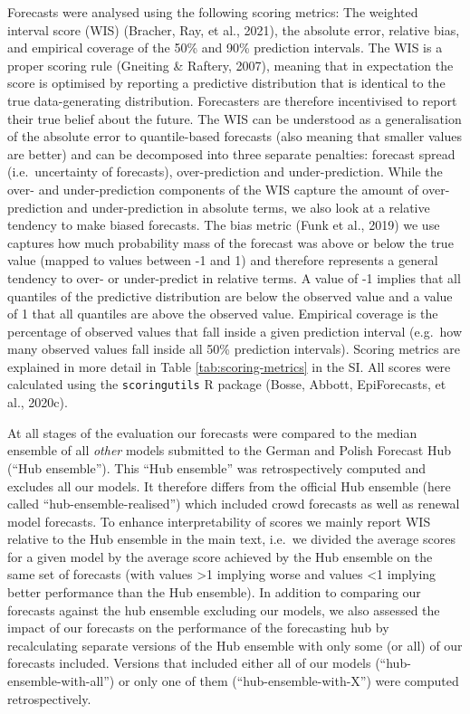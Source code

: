 \documentclass[
]{article}
\begin{document}
Forecasts were analysed using the following scoring metrics: The weighted interval score (WIS) (Bracher, Ray, et al., 2021), the absolute error, relative bias, and empirical coverage of the 50\% and 90\% prediction intervals. The WIS is a proper scoring rule (Gneiting \& Raftery, 2007), meaning that in expectation the score is optimised by reporting a predictive distribution that is identical to the true data-generating distribution. Forecasters are therefore incentivised to report their true belief about the future. The WIS can be understood as a generalisation of the absolute error to quantile-based forecasts (also meaning that smaller values are better) and can be decomposed into three separate penalties: forecast spread (i.e.~uncertainty of forecasts), over-prediction and under-prediction. While the over- and under-prediction components of the WIS capture the amount of over-prediction and under-prediction in absolute terms, we also look at a relative tendency to make biased forecasts. The bias metric (Funk et al., 2019) we use captures how much probability mass of the forecast was above or below the true value (mapped to values between -1 and 1) and therefore represents a general tendency to over- or under-predict in relative terms. A value of -1 implies that all quantiles of the predictive distribution are below the observed value and a value of 1 that all quantiles are above the observed value. Empirical coverage is the percentage of observed values that fall inside a given prediction interval (e.g.~how many observed values fall inside all 50\% prediction intervals). Scoring metrics are explained in more detail in Table \ref{tab:scoring-metrics} in the SI. All scores were calculated using the \texttt{scoringutils} R package (Bosse, Abbott, EpiForecasts, et al., 2020c).

At all stages of the evaluation our forecasts were compared to the median ensemble of all \emph{other} models submitted to the German and Polish Forecast Hub (``Hub ensemble''). This ``Hub ensemble'' was retrospectively computed and excludes all our models. It therefore differs from the official Hub ensemble (here called ``hub-ensemble-realised'') which included crowd forecasts as well as renewal model forecasts. To enhance interpretability of scores we mainly report WIS relative to the Hub ensemble in the main text, i.e.~we divided the average scores for a given model by the average score achieved by the Hub ensemble on the same set of forecasts (with values \textgreater1 implying worse and values \textless1 implying better performance than the Hub ensemble). In addition to comparing our forecasts against the hub ensemble excluding our models, we also assessed the impact of our forecasts on the performance of the forecasting hub by recalculating separate versions of the Hub ensemble with only some (or all) of our forecasts included. Versions that included either all of our models (``hub-ensemble-with-all'') or only one of them (``hub-ensemble-with-X'') were computed retrospectively.
\end{document}

